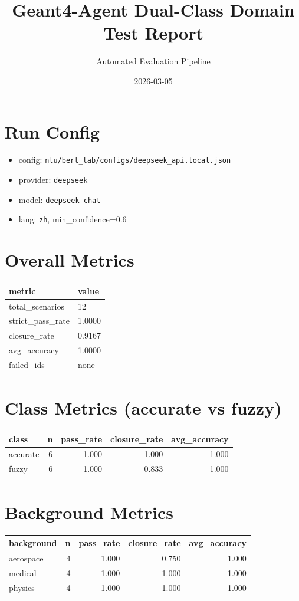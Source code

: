 \documentclass[11pt]{article}
\title{Geant4-Agent Dual-Class Domain Test Report}
\author{Automated Evaluation Pipeline}
\date{2026-03-05}
\begin{document}
\maketitle
\section{Run Config}
\begin{itemize}
\item config: \texttt{nlu/bert\_lab/configs/deepseek\_api.local.json}
\item provider: \texttt{deepseek}
\item model: \texttt{deepseek-chat}
\item lang: \texttt{zh}, min\_confidence=0.6
\end{itemize}
\section{Overall Metrics}
\begin{longtable}{ll}
\toprule
metric & value\\
\midrule
total\_scenarios & 12 \\
strict\_pass\_rate & 1.0000 \\
closure\_rate & 0.9167 \\
avg\_accuracy & 1.0000 \\
failed\_ids & none \\
\bottomrule
\end{longtable}
\section{Class Metrics (accurate vs fuzzy)}
\begin{longtable}{lrrrr}
\toprule
class & n & pass\_rate & closure\_rate & avg\_accuracy\\
\midrule
accurate & 6 & 1.000 & 1.000 & 1.000 \\
fuzzy & 6 & 1.000 & 0.833 & 1.000 \\
\bottomrule
\end{longtable}
\section{Background Metrics}
\begin{longtable}{lrrrr}
\toprule
background & n & pass\_rate & closure\_rate & avg\_accuracy\\
\midrule
aerospace & 4 & 1.000 & 0.750 & 1.000 \\
medical & 4 & 1.000 & 1.000 & 1.000 \\
physics & 4 & 1.000 & 1.000 & 1.000 \\
\bottomrule
\end{longtable}
\end{document}
